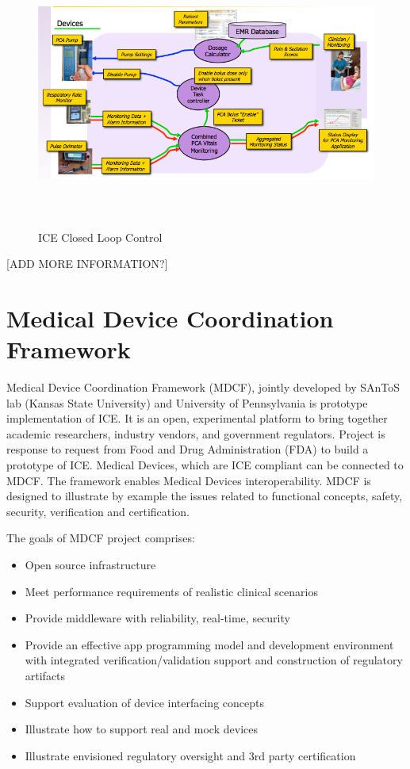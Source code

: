 \begin{figure}[ht]%
    \begin{center}
    	\includegraphics[height=3.5in]{figures/ice.png}   	
    \end{center}
    \caption{ICE Closed Loop Control}
    \label{figure:ice}
\end{figure}

[ADD MORE INFORMATION?]


\section{Medical Device Coordination Framework}
\label{background:mdcf}

Medical Device Coordination Framework (MDCF), jointly developed by SAnToS lab (Kansas State University) and University of Pennsylvania is prototype implementation of ICE. It is an open, experimental platform to bring together academic researchers, industry vendors, and government regulators. Project is response to request from Food and Drug Administration (FDA) to build a prototype of ICE. Medical Devices, which are ICE compliant can be connected to MDCF. The framework enables Medical Devices interoperability. MDCF is designed to illustrate by example the issues related to functional concepts, safety, security, verification and certification. 

The goals of MDCF project comprises:
\begin{itemize}
	\item Open source infrastructure
	\item Meet performance requirements of realistic clinical scenarios
	\item Provide middleware with reliability, real-time, security
	\item Provide an effective app programming model and development environment with integrated verification/validation support and construction of regulatory artifacts
	\item Support evaluation of device interfacing concepts
	\item Illustrate how to support real and mock devices
	\item Illustrate envisioned regulatory oversight and 3rd party certification
\end{itemize}

